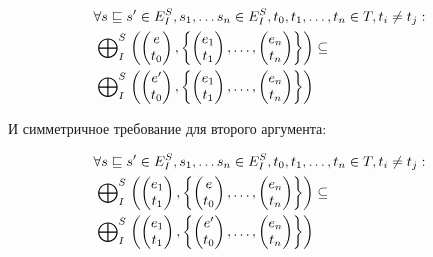 \begin{equation}
\label{cpa_tm_epp_split_req_1}
\begin{aligned}
& \forall s \sqsubseteq s' \in E^S_I, s_1, \dots s_n \in E^S_I, t_0,t_1,\dots,t_n \in T, t_i \neq t_j : \\
& \mathrel{\bigoplus}^S_I
\left(
\begin{pmatrix}
e \\
t_0 
\end{pmatrix} ,
\left\{
\begin{pmatrix}
e_1 \\
t_1 
\end{pmatrix} ,
\dots ,
\begin{pmatrix}
e_n \\
t_n 
\end{pmatrix}
\right\}
\right)
\subseteq \\
&\mathrel{\bigoplus}^S_I
\left(
\begin{pmatrix}
e' \\
t_0 
\end{pmatrix} ,
\left\{
\begin{pmatrix}
e_1 \\
t_1 
\end{pmatrix},
\dots ,
\begin{pmatrix}
e_n \\
t_n 
\end{pmatrix}
\right\}
\right)
\end{aligned}
\end{equation}

И симметричное требование для второго аргумента:

\begin{equation}
\label{cpa_tm_epp_split_req_2}
\begin{aligned}
& \forall s \sqsubseteq s' \in E^S_I, s_1, \dots s_n \in E^S_I, t_0,t_1,\dots,t_n \in T, t_i \neq t_j : \\
& \mathrel{\bigoplus}^S_I
\left(
\begin{pmatrix}
e_1 \\
t_1 
\end{pmatrix} ,
\left\{
\begin{pmatrix}
e \\
t_0 
\end{pmatrix} ,
\dots ,
\begin{pmatrix}
e_n \\
t_n 
\end{pmatrix}
\right\}
\right)
\subseteq \\
&\mathrel{\bigoplus}^S_I
\left(
\begin{pmatrix}
e_1 \\
t_1 
\end{pmatrix} ,
\left\{
\begin{pmatrix}
e' \\
t_0 
\end{pmatrix},
\dots ,
\begin{pmatrix}
e_n \\
t_n 
\end{pmatrix}
\right\}
\right)
\end{aligned}
\end{equation}

